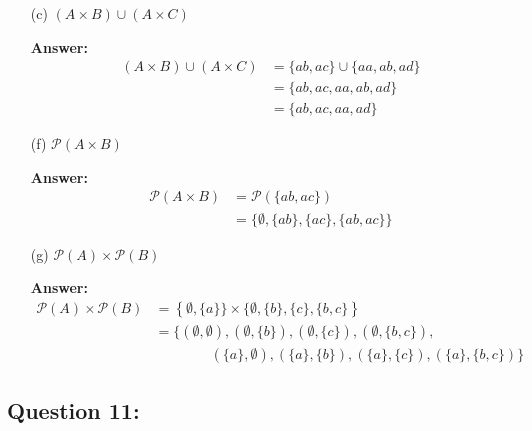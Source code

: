 \documentclass[14pt]{extreport}
\newcommand{\answer}[0]{\medskip \textbf{Answer:} \medskip}
\newcommand{\union}[0]{\cup}
\begin{document}
\begin{enumerate}
        \begin{enumerate}
            
            \item[(c)] \( (A \times B) \union (A \times C) \)
            
                \answer
                \begin{align*}
                    (A \times B) \union (A \times C) &= \{ab, ac\} \union \{aa, ab, ad\} \\
                                                    &= \{ab, ac, aa, ab, ad\} \\
                                                    &= \{ab, ac, aa, ad\}
                \end{align*}

            \item[(f)] \( \mathcal{P}(A \times B) \)
            
                \answer
                \begin{align*}
                    \mathcal{P}(A \times B) &= \mathcal{P}(\{ab, ac\}) \\
                        &= \{ \emptyset, \{ab\}, \{ac\}, \{ab, ac\} \}
                \end{align*}

            \item[(g)] \( \mathcal{P}(A) \times \mathcal{P}(B) \)
            
                \answer
                \begin{align*}
                    \mathcal{P}(A) \times \mathcal{P}(B) &= \left\{ \emptyset, \{a\} \} \times \{ \emptyset, \{b\}, \{c\}, \{b, c\} \right\} \\
                        &= \{ (\emptyset, \emptyset), (\emptyset, \{b\}), (\emptyset, \{c\}), (\emptyset, \{b, c\}), \\
                        & \qquad \qquad (\{a\}, \emptyset), (\{a\}, \{b\}), (\{a\}, \{c\}), (\{a\}, \{b, c\}) \}
                \end{align*}

        \end{enumerate}

\end{enumerate}
\newpage

\subsection*{Question 11:}
\end{document}
